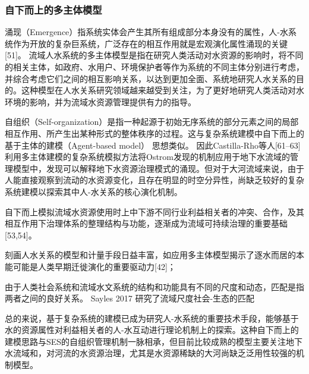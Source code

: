 \subsubsection*{自下而上的多主体模型}
涌现（Emergence）指系统实体会产生其所有组成部分本身没有的属性，人-水系统作为开放的复杂巨系统，广泛存在的相互作用就是宏观演化属性涌现的关键[51]。
流域人水系统的多主体模型是指在研究人类活动对水资源的影响时，将不同的相关主体，如政府、水用户、环境保护者等作为系统的不同主体分别进行考虑，并综合考虑它们之间的相互影响关系，以达到更加全面、系统地研究人水关系的目的。这种模型在人水关系研究领域越来越受到关注，为了更好地研究人类活动对水环境的影响，并为流域水资源管理提供有力的指导。

自组织（Self-organization）是指一种起源于初始无序系统的部分元素之间的局部相互作用、所产生出某种形式的整体秩序的过程。这与复杂系统建模中自下而上的基于主体的建模（Agent-based model） 思想类似。
因此Castilla-Rho等人[61–63]利用多主体建模的复杂系统模拟方法将Ostrom发现的机制应用于地下水流域的管理模型中，发现可以解释地下水资源治理模式的涌现。但对于大河流域来说，由于人能直接观察到流动的水资源变化，且存在明显的时空分异性，尚缺乏较好的复杂系统建模以探索其中人-水关系的核心演化机制。

自下而上模拟流域水资源使用时上中下游不同行业利益相关者的冲突、合作，及其相互作用下治理体系的整理结构与功能，逐渐成为流域可持续治理的重要基础[53,54]。


刻画人水关系的模型和计量手段日益丰富，如应用多主体模型揭示了逐水而居的本能可能是人类早期迁徙演化的重要驱动力[42]；

由于人类社会系统和流域水文系统的结构和功能具有不同的尺度和动态，匹配是指两者之间的良好关系。
Sayles 2017 研究了流域尺度社会-生态的匹配

总的来说，基于复杂系统的建模已成为研究人-水系统的重要技术手段，能够基于水的资源属性对利益相关者的人-水互动进行理论机制上的探索。这种自下而上的建模思路与SES的自组织管理机制一脉相承，但目前比较成熟的模型主要关注地下水流域和，对河流的水资源治理，尤其是水资源稀缺的大河尚缺乏泛用性较强的机制模型。
